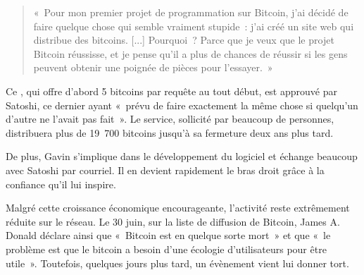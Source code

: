 \begin{quote}
«~Pour mon premier projet de programmation sur Bitcoin, j'ai décidé de faire quelque chose qui semble vraiment stupide~: j'ai créé un site web qui distribue des bitcoins. [...] Pourquoi~? Parce que je veux que le projet Bitcoin réussisse, et je pense qu'il a plus de chances de réussir si les gens peuvent obtenir une poignée de pièces pour l'essayer.~»
\end{quote}

Ce , qui offre d'abord 5 bitcoins par requête au tout début, est approuvé par Satoshi, ce dernier ayant «~prévu de faire exactement la même chose si quelqu'un d'autre ne l'avait pas fait~». Le service, sollicité par beaucoup de personnes, distribuera plus de 19~700 bitcoins jusqu'à sa fermeture deux ans plus tard. %

De plus, Gavin s'implique dans le développement du logiciel et échange beaucoup avec Satoshi par courriel. Il en devient rapidement le bras droit grâce à la confiance qu'il lui inspire.

Malgré cette croissance économique encourageante, l'activité reste extrêmement réduite sur le réseau. Le 30 juin, sur la liste de diffusion de Bitcoin, James A. Donald déclare ainsi que «~Bitcoin est en quelque sorte mort~» et que «~le problème est que le bitcoin a besoin d'une écologie d'utilisateurs pour être utile~». Toutefois, quelques jours plus tard, un évènement vient lui donner tort.

